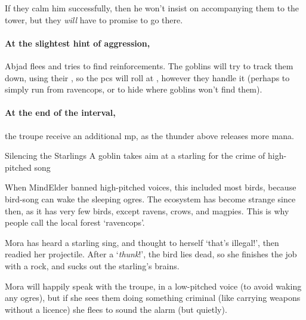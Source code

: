 If they calm him successfully, then he won't insist on accompanying them to the tower, but they \emph{will} have to promise to go there.

\paragraph{At the slightest hint of aggression,}
Abjad flees and tries to find reinforcements.
The goblins will try to track them down, using their , so the \glspl{pc} will roll at \tn, however they handle it (perhaps  to simply run from \gls{ravencops}, or  to hide where goblins won't find them).

\paragraph{At the end of the \gls{interval},}
the troupe receive an additional \gls{mp}, as the thunder above releases more mana.

{Silencing the Starlings}%
{A goblin takes aim at a starling for the crime of high-pitched song}%


\begin{exampletext}
  When \gls{MindElder} banned high-pitched voices, this included most birds, because bird-song can wake the sleeping \glspl{ogre}.
  The ecosystem has become strange since then, as it has very few birds, except ravens, crows, and magpies.
  This is why people call the local forest `\gls{ravencops}'.
\end{exampletext}

Mora has heard a starling sing, and thought to herself `that's illegal!', then readied her \gls{projectile}.
After a `\emph{thunk}!', the bird lies dead, so she finishes the job with a rock, and sucks out the starling's brains.

Mora will happily speak with the troupe, in a low-pitched voice (to avoid waking any \glspl{ogre}), but if she sees them doing something criminal (like carrying weapons without a licence) she flees to sound the alarm (but quietly).


